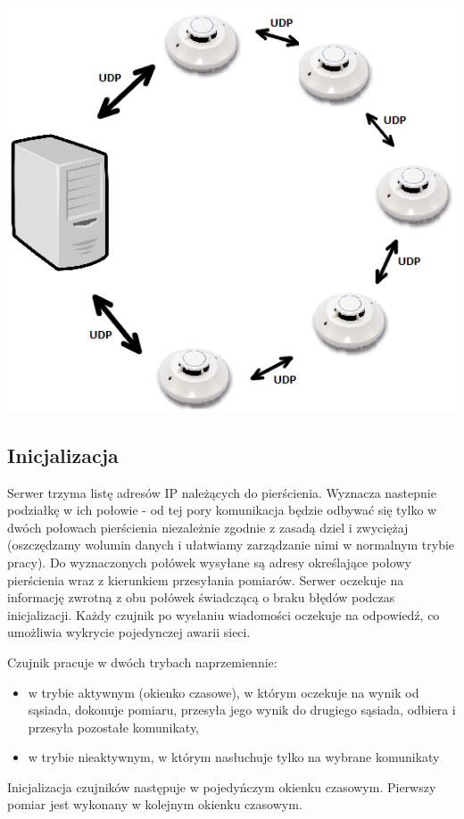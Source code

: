 \documentclass[a4paper,11pt]{article}
\begin{document}
\begin{center}
\includegraphics[scale=0.5]{architektura}
\end{center}

\subsection{Inicjalizacja}
Serwer trzyma listę adresów IP należących do pierścienia.
Wyznacza nastepnie podziałkę w ich połowie - od tej pory komunikacja będzie odbywać się tylko w dwóch
połowach pierścienia niezależnie zgodnie z zasadą dziel i zwyciężaj
(oszczędzamy wolumin danych i ułatwiamy zarządzanie nimi w normalnym trybie pracy).
Do wyznaczonych połówek wysyłane są adresy określające połowy pierścienia wraz z kierunkiem
przesyłania pomiarów. Serwer oczekuje na informację zwrotną z obu połówek świadczącą o braku
błędów podczas inicjalizacji. Każdy czujnik po wysłaniu wiadomości oczekuje na odpowiedź,
co umożliwia wykrycie pojedynczej awarii sieci.

\newpage
Czujnik pracuje w dwóch trybach naprzemiennie:
\begin{itemize}
\item w trybie aktywnym (okienko czasowe), w którym oczekuje na wynik od sąsiada,
      dokonuje pomiaru, przesyła jego wynik do drugiego sąsiada,
      odbiera i przesyła pozostałe komunikaty,
\item w trybie nieaktywnym, w którym nasłuchuje tylko na wybrane komunikaty
\end{itemize}
Inicjalizacja czujników następuje w pojedyńczym okienku czasowym.
Pierwszy pomiar jest wykonany w kolejnym okienku czasowym.
\end{document}
